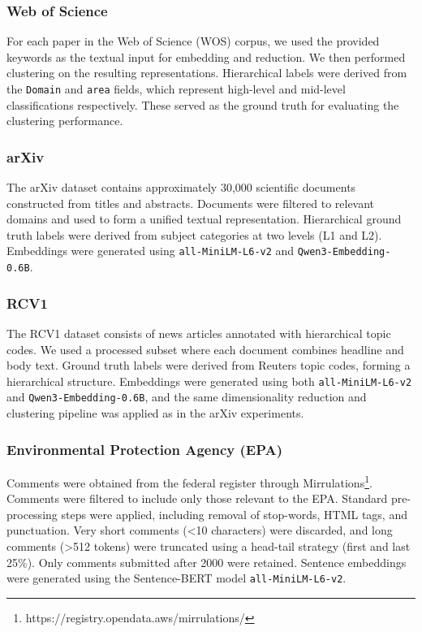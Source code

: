 \subsubsection*{Web of Science}

For each paper in the Web of Science (WOS) corpus, we used the provided keywords as the textual input for embedding and reduction. We then performed clustering on the resulting representations. Hierarchical labels were derived from the \texttt{Domain} and \texttt{area} fields, which represent high-level and mid-level classifications respectively. These served as the ground truth for evaluating the clustering performance.
\subsubsection*{arXiv}

The arXiv dataset contains approximately 30,000 scientific documents constructed from titles and abstracts. Documents were filtered to relevant domains and used to form a unified textual representation. Hierarchical ground truth labels were derived from subject categories at two levels (L1 and L2). Embeddings were generated using \texttt{all-MiniLM-L6-v2} and \texttt{Qwen3-Embedding-0.6B}.

\subsubsection*{RCV1}
The RCV1 dataset consists of news articles annotated with hierarchical topic codes. We used a processed subset where each document combines headline and body text. Ground truth labels were derived from Reuters topic codes, forming a hierarchical structure. Embeddings were generated using both \texttt{all-MiniLM-L6-v2} and \texttt{Qwen3-Embedding-0.6B}, and the same dimensionality reduction and clustering pipeline was applied as in the arXiv experiments.


\subsubsection*{Environmental Protection Agency (EPA)}
Comments were obtained from the federal register through Mirrulations\footnote{https://registry.opendata.aws/mirrulations/}. Comments were filtered to include only those relevant to the EPA. Standard pre-processing steps were applied, including removal of stop-words, HTML tags, and punctuation. Very short comments (<10 characters) were discarded, and long comments (>512 tokens) were truncated using a head-tail strategy (first and last 25\%). Only comments submitted after 2000 were retained. Sentence embeddings were generated using the Sentence-BERT model \texttt{all-MiniLM-L6-v2}.

